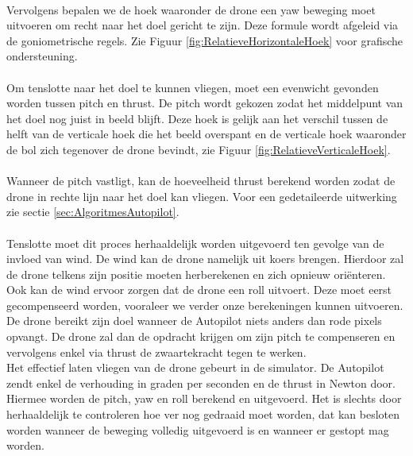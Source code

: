 \\
Vervolgens bepalen we de hoek waaronder de drone een yaw beweging moet uitvoeren om recht naar het doel gericht te zijn. Deze formule wordt afgeleid via de goniometrische regels. Zie Figuur \ref{fig:RelatieveHorizontaleHoek} voor grafische ondersteuning. 
\\
\\
Om tenslotte naar het doel te kunnen vliegen, moet een evenwicht gevonden worden tussen pitch en thrust. De pitch wordt gekozen zodat het middelpunt van het doel nog juist in beeld blijft. Deze hoek is gelijk aan het verschil tussen de helft van de verticale hoek die het beeld overspant en de verticale hoek waaronder de bol zich tegenover de drone bevindt, zie Figuur \ref{fig:RelatieveVerticaleHoek}. 
\\
\\
Wanneer de pitch vastligt, kan de hoeveelheid thrust berekend worden zodat de drone in rechte lijn naar het doel kan vliegen. Voor een gedetaileerde uitwerking zie sectie \ref{sec:AlgoritmesAutopilot}.
\\
\\
Tenslotte moet dit proces herhaaldelijk worden uitgevoerd ten gevolge van de invloed van wind. De wind kan de drone namelijk uit koers brengen. Hierdoor zal de drone telkens zijn positie moeten herberekenen en zich opnieuw ori\"enteren. Ook kan de wind ervoor zorgen dat de drone een roll uitvoert. Deze moet eerst gecompenseerd worden, vooraleer we verder onze berekeningen kunnen uitvoeren.
\\
De drone bereikt zijn doel wanneer de Autopilot niets anders dan rode pixels opvangt. De drone zal dan de opdracht krijgen om zijn pitch te compenseren en vervolgens enkel via thrust de zwaartekracht tegen te werken.
\\
Het effectief laten vliegen van de drone gebeurt in de simulator. De Autopilot zendt enkel de verhouding in graden per seconden en de thrust in Newton door. Hiermee worden de pitch, yaw en roll berekend en uitgevoerd. Het is slechts door herhaaldelijk te controleren hoe ver nog gedraaid moet worden, dat kan besloten worden wanneer de beweging volledig uitgevoerd is en wanneer er gestopt mag worden.
\\
